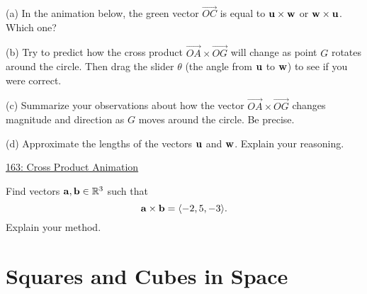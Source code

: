 \documentclass{ximera}
\begin{document}
\begin{exploration}  \label{E73830233}
(a) In the animation below, the green vector $\overrightarrow{OC}$ is equal to ${\bf u}\times {\bf w}$ or ${\bf w}\times {\bf u}$. Which one? 

(b) Try to predict how the cross product $\overrightarrow{OA}\times \overrightarrow{OG}$ will change as point $G$ rotates around the circle. Then drag the slider $\theta$ (the angle from ${\bf u}$ to ${\bf w}$) to see if you were correct.

(c) Summarize your observations about how the vector $\overrightarrow{OA}\times \overrightarrow{OG}$ changes magnitude and direction as $G$ moves around the circle. Be precise.

(d) Approximate the lengths of the vectors ${\bf u}$ and ${\bf w}$. Explain your reasoning.

\begin{onlineOnly}
    \begin{center}
\end{center}
\end{onlineOnly}

\href{https://www.geogebra.org/classic/atvydddh}{163: Cross Product Animation}
\end{exploration}


\begin{question} \label{Q344343222111}
Find vectors ${\bf a}, {\bf b}\in \mathbb{R}^3$ such that
\[
       {\bf a} \times {\bf b} = \langle -2, 5, -3 \rangle .
\]
Explain your method.
\end{question}


\section{Squares and Cubes in Space}
\end{document}
